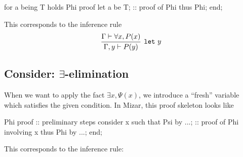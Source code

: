 \begin{mizar}
for a being T holds Phi
proof
  let a be T;
  :: proof of Phi
  thus Phi;
end;
\end{mizar}%
This corresponds to the inference rule
\begin{equation}
\vcenter{\infer[\mathtt{let}~y]{\Gamma,y\vdash P(y)}{\Gamma\vdash\forall x,P(x)}}
\end{equation}

\subsection{Consider: $\exists$-elimination}
When we want to apply the fact $\exists x,\Psi(x)$, we introduce a
``fresh'' variable which satisfies the given condition. In Mizar, this
proof skeleton looks like
\begin{mizar}
Phi
proof
  :: preliminary steps
  consider x such that Psi by ...;
  :: proof of Phi involving x
  thus Phi by ...;
end;
\end{mizar}%
This corresponds to the inference rule:
